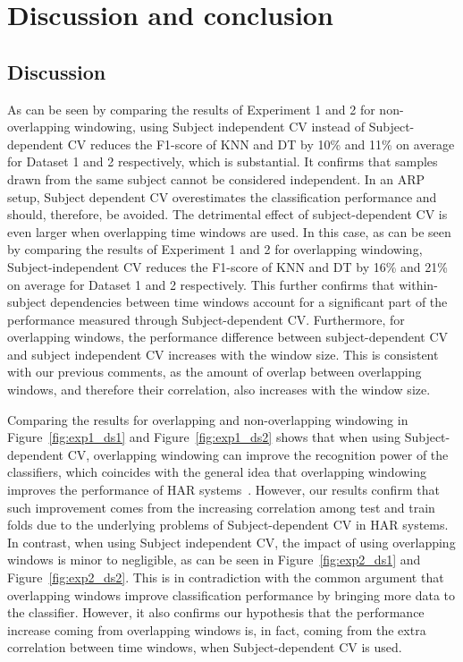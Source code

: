 \chapter{Discussion and conclusion} \label{discussion_conclusion}
\section{Discussion} \label{sec:discussion}
As can be seen by comparing the results of Experiment 1 and 2 for non-overlapping windowing, using Subject independent CV instead of 
Subject-dependent CV reduces the F1-score of KNN and DT by 10\% and 11\% on average for Dataset 1 and 2 respectively, which is substantial. It confirms that samples drawn from the 
same subject cannot be considered independent. In an ARP setup, Subject dependent CV overestimates the classification performance and should, therefore, be avoided.
The detrimental effect of subject-dependent CV is even larger when overlapping time windows are used. In this case, as can be seen by comparing the results of Experiment 1 and 2 for overlapping windowing, Subject-independent CV reduces the F1-score of KNN and DT by 16\% and 21\% on average for Dataset 1 and 2 respectively. This 
further confirms that within-subject dependencies between time windows account for a significant part of the performance measured through 
Subject-dependent CV. Furthermore, for overlapping windows, the performance 
difference between subject-dependent CV and subject independent CV increases with the window 
size. This is consistent with our previous comments, as the amount of 
overlap between overlapping windows, and therefore their correlation, 
also increases with the window size.

Comparing the results for overlapping and non-overlapping windowing in Figure~\ref{fig:exp1_ds1} and Figure~\ref{fig:exp1_ds2} shows that when using Subject-dependent CV, overlapping windowing can improve the recognition power of the classifiers, which coincides with the general idea that overlapping windowing improves the performance of HAR systems~\cite{janidarmian2017comprehensive,janidarmian2014automated}. 
However, our results confirm that such improvement comes from the 
increasing correlation among test and train folds due to the underlying 
problems of Subject-dependent CV in HAR systems.      
In contrast, when using Subject independent CV, the impact of using overlapping
windows is minor to negligible, as can be seen in  
Figure~\ref{fig:exp2_ds1} and Figure~\ref{fig:exp2_ds2}. This is in contradiction with 
the common argument that overlapping windows improve classification
performance by bringing more data to the classifier. However, it also 
confirms our hypothesis that the performance increase coming from 
overlapping windows is, in fact, coming from the extra correlation 
between time windows, when Subject-dependent CV is used.


